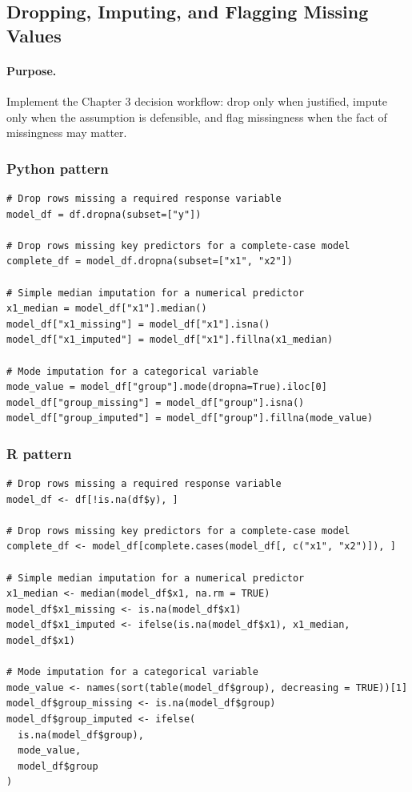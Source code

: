 \subsection{Dropping, Imputing, and Flagging Missing Values}
\label{app:ch03-software-cookbook-missing-decisions}

\paragraph{Purpose.} Implement the Chapter 3 decision workflow: drop only when justified, impute only when the assumption is defensible, and flag missingness when the fact of missingness may matter.

\subsubsection*{Python pattern}

\begin{verbatim}
# Drop rows missing a required response variable
model_df = df.dropna(subset=["y"])

# Drop rows missing key predictors for a complete-case model
complete_df = model_df.dropna(subset=["x1", "x2"])

# Simple median imputation for a numerical predictor
x1_median = model_df["x1"].median()
model_df["x1_missing"] = model_df["x1"].isna()
model_df["x1_imputed"] = model_df["x1"].fillna(x1_median)

# Mode imputation for a categorical variable
mode_value = model_df["group"].mode(dropna=True).iloc[0]
model_df["group_missing"] = model_df["group"].isna()
model_df["group_imputed"] = model_df["group"].fillna(mode_value)
\end{verbatim}

\subsubsection*{R pattern}

\begin{verbatim}
# Drop rows missing a required response variable
model_df <- df[!is.na(df$y), ]

# Drop rows missing key predictors for a complete-case model
complete_df <- model_df[complete.cases(model_df[, c("x1", "x2")]), ]

# Simple median imputation for a numerical predictor
x1_median <- median(model_df$x1, na.rm = TRUE)
model_df$x1_missing <- is.na(model_df$x1)
model_df$x1_imputed <- ifelse(is.na(model_df$x1), x1_median, model_df$x1)

# Mode imputation for a categorical variable
mode_value <- names(sort(table(model_df$group), decreasing = TRUE))[1]
model_df$group_missing <- is.na(model_df$group)
model_df$group_imputed <- ifelse(
  is.na(model_df$group),
  mode_value,
  model_df$group
)
\end{verbatim}

